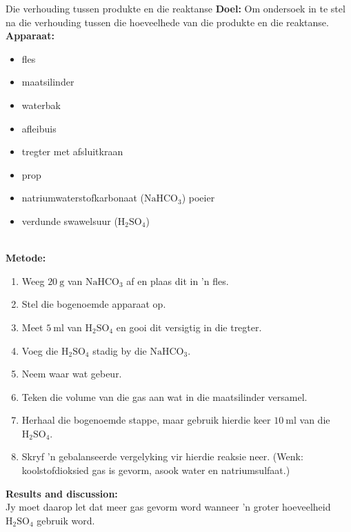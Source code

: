 \begin{g_experiment}{Die verhouding tussen produkte en die reaktanse}
\textbf{Doel:} Om ondersoek in te stel na die verhouding tussen die hoeveelhede van die produkte en die reaktanse.\\
\textbf{Apparaat:}\\
\begin{minipage}{.5\textwidth}
 \begin{itemize}[noitemsep]
  \item fles
\item maatsilinder
\item waterbak
\item afleibuis
\item tregter met afsluitkraan
\item prop
\item natriumwaterstofkarbonaat ($\text{NaHCO}_{3}$) poeier
\item verdunde swawelsuur ($\text{H}_{2}\text{SO}_{4}$)
 \end{itemize}
\end{minipage}
\begin{minipage}{.5\textwidth}
\begin{center}
\end{center}
\end{minipage} \\
\textbf{Metode:} 
\begin{enumerate}[noitemsep,label=\textbf{\arabic*}]
 \item Weeg $20~\text{g}$ van $\text{NaHCO}_{3}$ af en plaas dit in 'n fles.
\item Stel die bogenoemde apparaat op.
\item Meet $5~\text{ml}$ van $\text{H}_{2}\text{SO}_{4}$ en gooi dit versigtig in die tregter.
\item Voeg die $\text{H}_{2}\text{SO}_{4}$ stadig by die $\text{NaHCO}_{3}$.
\item Neem waar wat gebeur.
\item Teken die volume van die gas aan wat in die maatsilinder versamel.
\item Herhaal die bogenoemde stappe, maar gebruik hierdie keer $10~\text{ml}$ van die $\text{H}_{2}\text{SO}_{4}$.
\item Skryf 'n gebalanseerde vergelyking vir hierdie reaksie neer. (Wenk: koolstofdioksied gas is gevorm, asook water en natriumsulfaat.)
\end{enumerate}
\textbf{Results and discussion:}\\
Jy moet daarop let dat meer gas gevorm word wanneer  'n groter hoeveelheid $\text{H}_{2}\text{SO}_{4}$ gebruik word. 
\end{g_experiment}

